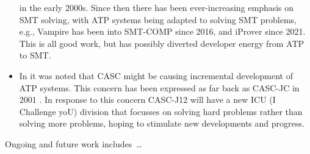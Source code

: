 \documentclass[runningheads]{llncs}
\begin{document}
\begin{itemize}
      in the early 2000s.
      Since then there has been ever-increasing emphasis on SMT solving, with ATP systems being 
      adapted to solving SMT problems, e.g., Vampire has been into SMT-COMP since 2016, and
      iProver since 2021.
      This is all good work, but has possibly diverted developer energy from ATP to SMT.
\item In \cite{SD24-CASC} it was noted that CASC might be causing incremental development of ATP
      systems.
      This concern has been expressed as far back as CASC-JC in 2001 \cite{PSS02}.
      In response to this concern CASC-J12 will have a new ICU (I Challenge yoU) division that
      focusses on solving hard problems rather than solving more problems, hoping to stimulate
      new developments and progress.
\end{itemize}

Ongoing and future work includes~\ldots



\end{document}
